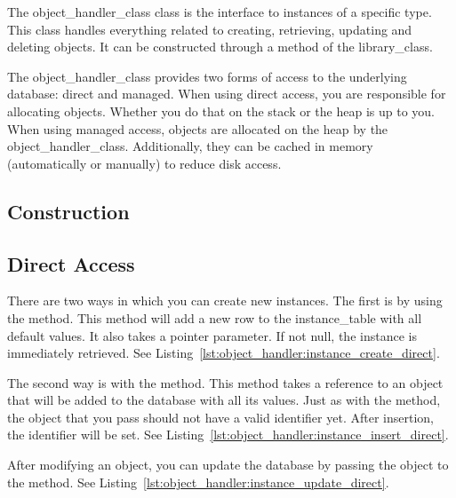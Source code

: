 The \gls{object_handler_class} class is the interface to instances of a specific type. This class handles everything related to creating, retrieving, updating and deleting objects. It can be constructed through a method of the \gls{library_class}.

The \gls{object_handler_class} provides two forms of access to the underlying database: direct and managed. When using direct access, you are responsible for allocating objects. Whether you do that on the stack or the heap is up to you. When using managed access, objects are allocated on the heap by the \gls{object_handler_class}. Additionally, they can be cached in memory (automatically or manually) to reduce disk access.

\subsection{Construction}

\subsection{Direct Access}

There are two ways in which you can create new instances. The first is by using the  method. This method will add a new row to the \gls{instance_table} with all default values. It also takes a pointer parameter. If not null, the instance is immediately retrieved. See Listing~\ref{lst:object_handler:instance_create_direct}.



The second way is with the  method. This method takes a reference to an object that will be added to the database with all its values. Just as with the  method, the object that you pass should not have a valid identifier yet. After insertion, the identifier will be set. See Listing~\ref{lst:object_handler:instance_insert_direct}.



After modifying an object, you can update the database by passing the object to the  method. See Listing~\ref{lst:object_handler:instance_update_direct}.

